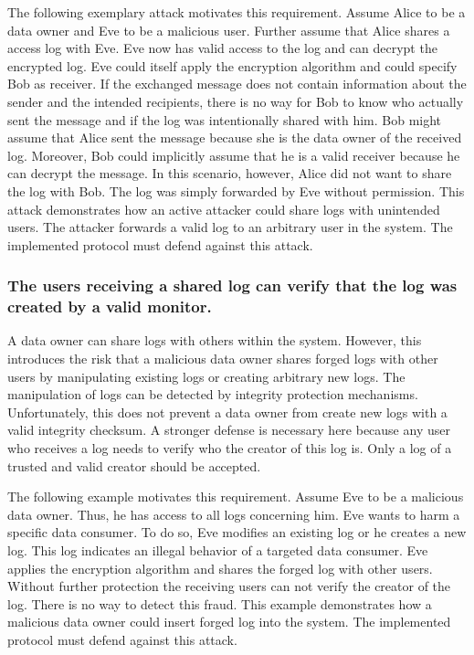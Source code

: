 \documentclass[../main.tex]{subfiles}
\begin{document}
The following exemplary attack motivates this requirement.
Assume Alice to be a data owner and Eve to be a malicious user.
Further assume that Alice shares a access log with Eve.
Eve now has valid access to the log and can decrypt the encrypted log.
Eve could itself apply the encryption algorithm and could specify Bob as receiver.
If the exchanged message does not contain information about the sender and the intended recipients, there is no way for Bob to know who actually sent the message and if the log was intentionally shared with him.
Bob might assume that Alice sent the message because she is the data owner of the received log.
Moreover, Bob could implicitly assume that he is a valid receiver because he can decrypt the message.
In this scenario, however, Alice did not want to share the log with Bob.
The log was simply forwarded by Eve without permission.
This attack demonstrates how an active attacker could share logs with unintended users.
The attacker forwards a valid log to an arbitrary user in the system.
The implemented protocol must defend against this attack.

\subsubsection{The users receiving a shared log can verify that the log was created by a valid monitor.}

A data owner can share logs with others within the system.
However, this introduces the risk that a malicious data owner shares forged logs with other users by manipulating existing logs or creating arbitrary new logs.
The manipulation of logs can be detected by integrity protection mechanisms.
Unfortunately, this does not prevent a data owner from create new logs with a valid integrity checksum.
A stronger defense is necessary here because any user who receives a log needs to verify who the creator of this log is.
Only a log of a trusted and valid creator should be accepted.

The following example motivates this requirement.
Assume Eve to be a malicious data owner.
Thus, he has access to all logs concerning him.
Eve wants to harm a specific data consumer.
To do so, Eve modifies an existing log or he creates a new log.
This log indicates an illegal behavior of a targeted data consumer.
Eve applies the encryption algorithm and shares the forged log with other users.
Without further protection the receiving users can not verify the creator of the log.
There is no way to detect this fraud.
This example demonstrates how a malicious data owner could insert forged log into the system.
The implemented protocol must defend against this attack.
\end{document}
